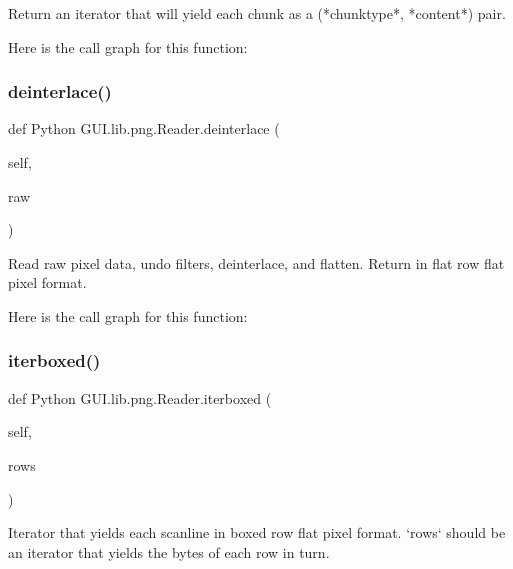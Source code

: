 \begin{DoxyVerb}Return an iterator that will yield each chunk as a
(*chunktype*, *content*) pair.
\end{DoxyVerb}
 Here is the call graph for this function\+:
\mbox{\label{class_python_01_g_u_i_1_1lib_1_1png_1_1_reader_a6a088c059d68156e7e660c4d30e09d75}} 
\subsubsection{\texorpdfstring{deinterlace()}{deinterlace()}}
{\footnotesize\ttfamily def Python G\+U\+I.\+lib.\+png.\+Reader.\+deinterlace (\begin{DoxyParamCaption}\item[{}]{self,  }\item[{}]{raw }\end{DoxyParamCaption})}

\begin{DoxyVerb}Read raw pixel data, undo filters, deinterlace, and flatten.
Return in flat row flat pixel format.
\end{DoxyVerb}
 Here is the call graph for this function\+:
\mbox{\label{class_python_01_g_u_i_1_1lib_1_1png_1_1_reader_aa96e3e861ca9e3dcd042266478f8197d}} 
\subsubsection{\texorpdfstring{iterboxed()}{iterboxed()}}
{\footnotesize\ttfamily def Python G\+U\+I.\+lib.\+png.\+Reader.\+iterboxed (\begin{DoxyParamCaption}\item[{}]{self,  }\item[{}]{rows }\end{DoxyParamCaption})}

\begin{DoxyVerb}Iterator that yields each scanline in boxed row flat pixel
format.  `rows` should be an iterator that yields the bytes of
each row in turn.
\end{DoxyVerb}
 \mbox{\label{class_python_01_g_u_i_1_1lib_1_1png_1_1_reader_a2a7a99295f841ace43bdc50855c35e36}} 
